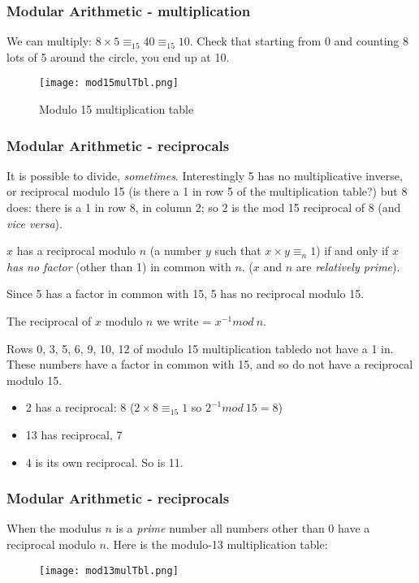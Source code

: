 \documentclass[10pt, hyperref={pdfpagelabels=false}]{beamer}
\begin{document}
\begin{frame}
\frametitle{Modular Arithmetic - multiplication}
We can multiply: $8 \times 5 \equiv_{15} 40 \equiv_{15} 10$. Check that starting from 0
and counting 8 lots of 5 around the circle, you end up at 10.

\begin{figure}
\caption{Modulo 15 multiplication table}
\texttt{[image: mod15mulTbl.png]}
\end{figure}
\end{frame}

\begin{frame}
\frametitle{Modular Arithmetic - reciprocals}
It is possible to divide, \emph{sometimes}. Interestingly 5 has no multiplicative
inverse, or reciprocal modulo 15 (is there a 1 in row 5 of the multiplication table?)
 but 8 does: there is a 1  in row 8, in column 2; so 2 is the mod 15 reciprocal of 8 (and \emph{vice versa}).

$x$ has a {\color{blue}reciprocal modulo $n$} (a number $y$ such that $x \times y \equiv_n 1$) if and only if $x$ \emph{has no factor} (other than 1) in common with $n$. ($x$ and $n$ are \emph{relatively prime}).

Since 5 has a factor in common with 15, 5 has no reciprocal modulo 15.

The reciprocal of $x$ modulo $n$ we write = $x^{-1} mod~n$.

Rows 0, 3, 5, 6, 9, 10, 12 of modulo 15 multiplication tabledo not have a 1 in. These numbers have a factor in common with 15, and so do not have a reciprocal modulo 15.

\begin{itemize}
\item 2 has a reciprocal: 8 ($2 \times 8 \equiv_{15} 1$ so $2^{-1} mod~15 = 8$)
\item 13 has reciprocal, 7
\item 4 is its own reciprocal. So is 11.
\end{itemize}
\end{frame}

\begin{frame}
\frametitle{Modular Arithmetic - reciprocals}
When the modulus $n$ is a \emph{\color{blue}prime} number all numbers other than 0 have a reciprocal modulo $n$. Here is the modulo-13 multiplication table:

\begin{figure}
\texttt{[image: mod13mulTbl.png]}
\end{figure}
\end{frame}
\end{document}
